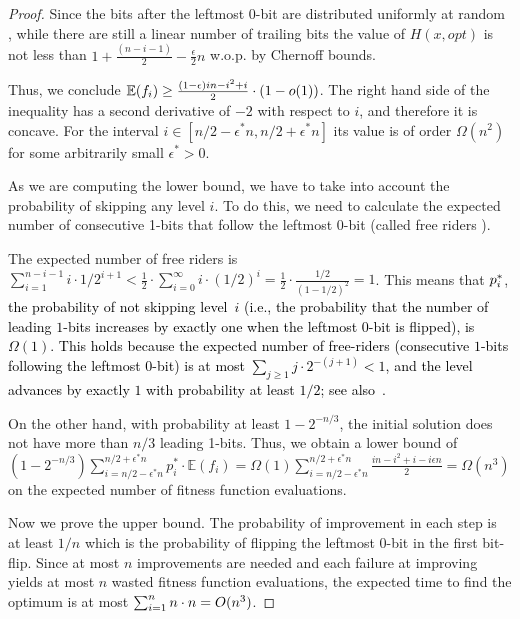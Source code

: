 \documentclass[lettersize,journal]{IEEEtran}
\newcommand{\EE}{\mathbb{E}}
\begin{document}
\begin{proof}
Since the bits after the leftmost 0-bit are distributed uniformly at random \cite{DrosteJansenWegener2002}, {\color{black} while there are still a linear number of trailing bits} the value of $H(x,opt)$ is not less than $1+ \frac{(n-i-1)}{2}- \frac{\epsilon }{2}n$ w.o.p. by Chernoff bounds. 

Thus, we conclude $\EE(f_i) \geq \frac{(1-\epsilon)in-i^2+i}{2}\cdot {\color{black}(1-o(1))}$. The right hand side of the inequality has a second derivative of $-2$ with respect to $i$, and therefore it is concave. For the interval $i\in [n/2-\epsilon^*n, n/2+\epsilon^*n]$ its value is of order $\Omega(n^2)$ for some   arbitrarily small $\epsilon^*>0$.


As we are computing the lower bound, we have to take into account the probability of skipping any level $i$. To do this, we need to calculate the expected number of consecutive 1-bits that follow the leftmost 0-bit (called free riders \cite{DrosteJansenWegener2002}). 

The expected number of free riders is $\sum_{i=1}^{n-i-1} i \cdot 1/2^{i+1} < \frac{1}{2} \cdot \sum_{i=0}^{\infty} i \cdot (1/2)^i= \frac{1}{2} \cdot \frac{1/2}{(1-1/2)^2}=1$. This means that ${\color{black}p^{*}_{i}}$, \textcolor{black}{the probability of not skipping level~$i$ (i.e., the probability that the number of leading $1$-bits increases by exactly one when the leftmost $0$-bit is flipped), is $\Omega(1)$. This holds because the expected number of free-riders (consecutive $1$-bits following the leftmost $0$-bit) is at most $\sum_{j\ge1}j\cdot 2^{-(j+1)}<1$, and the level advances by exactly $1$ with probability at least $1/2$; see also~\cite{DrosteJansenWegener2002}.}

On the other hand, with probability at least $1- 2^{-n/3}$, the initial solution does not have more than $n/3$ leading 1-bits. Thus, we obtain a lower 
bound of  $(1-2^{-n/3}) \sum_{i=n/2-\epsilon^*n}^{n/2+\epsilon^*n} p^{*}_{i}\cdot \EE(f_i)=\Omega(1) \sum_{i=n/2-\epsilon^*n}^{n/2+\epsilon^*n} \frac{in-i^2+i-i\epsilon n}{2}=\Omega(n^3)$ on the expected number of fitness function evaluations.

Now we prove the upper bound. The probability of improvement in each step is at least $1/n$ which is the probability of flipping the leftmost 0-bit {\color{black} in the first} bit-flip. Since at most $n$ improvements are needed and each failure at improving yields {\color{black} at most $n$} wasted fitness function evaluations, the expected time to find the optimum is at most $\sum_{i=1}^n n \cdot {\color{black}n}= O(n^3)$.

\end{proof}
\end{document}
